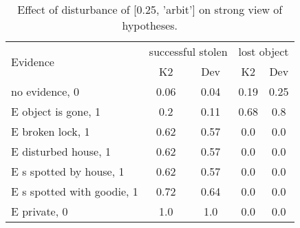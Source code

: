 \begin{table}\begin{tabular}{l|cc|cc}\toprule\multirow{2}{*}{Evidence} & \multicolumn{2}{c}{successful stolen}& \multicolumn{2}{c}{lost object}\\& {K2} & {Dev}& {K2} & {Dev}\\\midrule
no evidence, 0 & 0.06&0.04&\cellcolor{Bittersweet}0.19&\cellcolor{Bittersweet}0.25\\E object is gone, 1 & \cellcolor{Bittersweet}0.2&\cellcolor{Bittersweet}0.11&\cellcolor{Bittersweet}0.68&\cellcolor{Bittersweet}0.8\\E broken lock, 1 & \cellcolor{Bittersweet}0.62&\cellcolor{Bittersweet}0.57&0.0&0.0\\E disturbed house, 1 & \cellcolor{Bittersweet}0.62&\cellcolor{Bittersweet}0.57&0.0&0.0\\E s spotted by house, 1 & \cellcolor{Bittersweet}0.62&\cellcolor{Bittersweet}0.57&0.0&0.0\\E s spotted with goodie, 1 & \cellcolor{Bittersweet}0.72&\cellcolor{Bittersweet}0.64&0.0&0.0\\E private, 0 & 1.0&1.0&0.0&0.0\\\bottomrule\end{tabular}\caption{Effect of disturbance of [0.25, 'arbit'] on strong view of hypotheses.}\end{table}